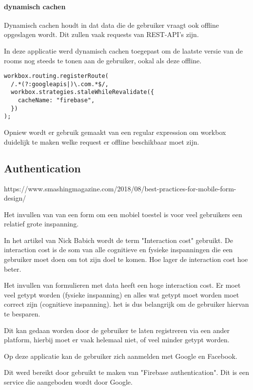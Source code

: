 					
		\paragraph{dynamisch cachen}
			Dynamisch cachen houdt in dat data die de gebruiker vraagt ook offline opgeslagen wordt. Dit zullen vaak requests van REST-API's zijn.
			
			In deze applicatie werd dynamisch cachen toegepast om de laatste versie van de rooms nog steeds te tonen aan de gebruiker, ookal als deze offline.
			
\begin{lstlisting}
workbox.routing.registerRoute(
  /.*(?:googleapis|)\.com.*$/,
  workbox.strategies.staleWhileRevalidate({
    cacheName: "firebase",
  })
);
\end{lstlisting}
		
			Opniew wordt er gebruik gemaakt van een regular expression om workbox duidelijk te maken welke request er offline beschikbaar moet zijn.


	
	\subsection{Authentication}
	
		https://www.smashingmagazine.com/2018/08/best-practices-for-mobile-form-design/
		
		Het invullen van van een form om een mobiel toestel is voor veel gebruikers een relatief grote inspanning.
		
		In het artikel van Nick Babich wordt de term "Interaction cost" gebruikt. De interaction cost is de som van alle cognitieve en fysieke inspanningen die een gebruiker moet doen om tot zijn doel te komen. Hoe lager de interaction cost hoe beter.
		
		Het invullen van formulieren met data heeft een hoge interaction cost. Er moet veel getypt worden (fysieke inspanning) en alles wat getypt moet worden moet correct zijn (cognitieve inspanning). het is dus belangrijk om de gebruiker hiervan te besparen.
		
		Dit kan gedaan worden door de gebruiker te laten registreren via een ander platform, hierbij moet er vaak helemaal niet, of veel minder getypt worden.
		
		Op deze applicatie kan de gebruiker zich aanmelden met Google en Facebook.
		
		Dit werd bereikt door gebruikt te maken van "Firebase authentication". Dit is een service die aangeboden wordt door Google.
		
